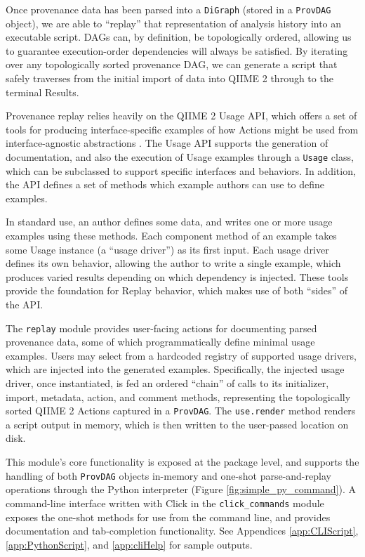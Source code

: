 Once provenance data has been parsed into a \texttt{DiGraph} (stored in a \texttt{ProvDAG}
object), we are able to “replay” that representation of analysis history into an
executable script. DAGs can, by definition, be topologically ordered, allowing
us to guarantee execution-order dependencies will always be satisfied. By
iterating over any topologically sorted provenance DAG, we can generate a script
that safely traverses from the initial import of data into QIIME 2 through to
the terminal Results.

Provenance replay relies heavily on the QIIME 2 Usage API, which offers a set of
tools for producing interface-specific examples of how Actions might be used
from interface-agnostic abstractions \parencite{qiime_2_development_team_usage_2018}.
The Usage API supports the generation of documentation, and also the execution
of Usage examples through a \texttt{Usage} class, which can be subclassed to support
specific interfaces and behaviors. In addition, the API defines a set of methods
which example authors can use to define examples.

In standard use, an author defines some data, and writes one or more usage
examples using these methods. Each component method of an example takes some
Usage instance (a “usage driver”) as its first input. Each usage driver defines
its own behavior, allowing the author to write a single example, which produces
varied results depending on which dependency is injected. These tools provide
the foundation for Replay behavior, which makes use of both “sides” of the API. 

The \texttt{replay} module provides user-facing actions for documenting parsed provenance
data, some of which programmatically define minimal usage examples. Users may
select from a hardcoded registry of supported usage drivers, which are injected
into the generated examples. Specifically, the injected usage driver, once
instantiated, is fed an ordered “chain” of calls to its initializer, import,
metadata, action, and comment methods, representing the topologically sorted
QIIME 2 Actions captured in a \texttt{ProvDAG}. The \texttt{use.render} method renders a script
output in memory, which is then written to the user-passed location on disk.

This module’s core functionality is exposed at the package level, and supports
the handling of both \texttt{ProvDAG} objects in-memory and one-shot parse-and-replay
operations through the Python interpreter (Figure \ref{fig:simple_py_command}).
A command-line interface written with
Click \parencite{pallets_click_2014} in the \texttt{click\_commands} module exposes the
one-shot methods for use from the command line, and provides documentation and
tab-completion functionality. See Appendices \ref{app:CLIScript},
\ref{app:PythonScript}, and \ref{app:cliHelp} for sample outputs.


